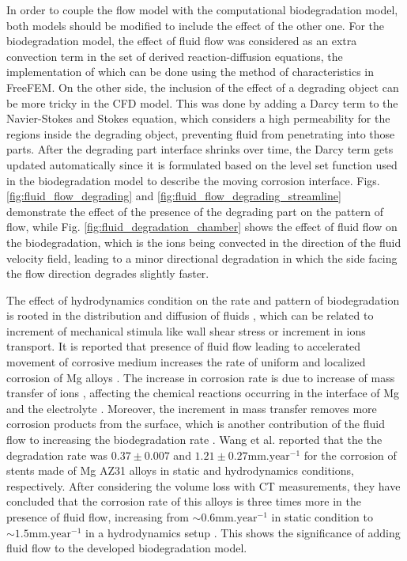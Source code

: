 In order to couple the flow model with the computational biodegradation model, both models should be modified to include the effect of the other one. For the biodegradation model, the effect of fluid flow was considered as an extra convection term in the set of derived reaction-diffusion equations, the implementation of which can be done using the method of characteristics in FreeFEM. On the other side, the inclusion of the effect of a degrading object can be more tricky in the CFD model. This was done by adding a Darcy term to the Navier-Stokes and Stokes equation, which considers a high permeability for the regions inside the degrading object, preventing fluid from penetrating into those parts. After the degrading part interface shrinks over time, the Darcy term gets updated automatically since it is formulated based on the level set function used in the biodegradation model to describe the moving corrosion interface. Figs. \ref{fig:fluid_flow_degrading} and \ref{fig:fluid_flow_degrading_streamline} demonstrate the effect of the presence of the degrading part on the pattern of flow, while Fig. 
\ref{fig:fluid_degradation_chamber} shows the effect of fluid flow on the biodegradation, which is the ions being convected in the direction of the fluid velocity field, leading to a minor directional degradation in which the side facing the flow direction degrades slightly faster. 

The effect of hydrodynamics condition on the rate and pattern of biodegradation is rooted in the distribution and diffusion of fluids \cite{Efird2011}, which can be related to increment of mechanical stimula like wall shear stress or increment in ions transport. It is reported that presence of fluid flow leading to accelerated movement of corrosive medium increases the rate of uniform and localized corrosion of Mg alloys \cite{Wang2014}. The increase in corrosion rate is due to increase of mass transfer of ions \cite{Efird2011}, affecting the chemical reactions occurring in the interface of Mg and the electrolyte \cite{Hiromoto2008,Xu2009}. Moreover, the increment in mass transfer removes more corrosion products from the surface, which is another contribution of the fluid flow to increasing the biodegradation rate \cite{Efird2011}. Wang et al. \cite{Wang2014} reported that the the degradation rate was $0.37\pm0.007$ and $1.21\pm0.27 \text{mm.year}^{-1}$ for the corrosion of stents made of Mg AZ31 alloys in static and hydrodynamics conditions, respectively. After considering the volume loss with CT measurements, they have concluded that the corrosion rate of this alloys is three times more in the presence of fluid flow, increasing from $\sim 0.6\text{mm.year}^{-1}$ in static condition to $\sim 1.5\text{mm.year}^{-1}$ in a hydrodynamics setup \cite{Wang2014}. This shows the significance of adding fluid flow to the developed biodegradation model.













\cleardoublepage
